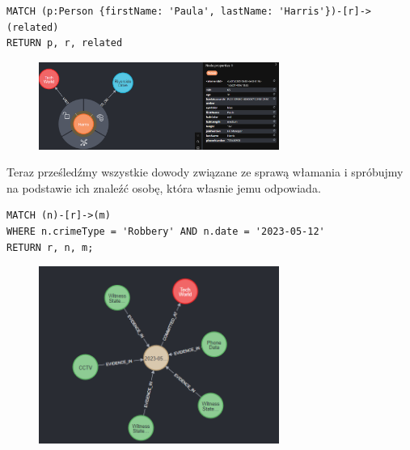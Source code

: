 \documentclass[a4paper,12pt]{article}
\begin{document}
\begin{center}
\begin{minipage}{0.8\linewidth}
\begin{lstlisting}[language=Cypher, basicstyle=\small, breaklines=true]
MATCH (p:Person {firstName: 'Paula', lastName: 'Harris'})-[r]->(related)
RETURN p, r, related
\end{lstlisting}
\end{minipage}
\end{center}

\begin{figure}[h!]
    \centering
    \includegraphics[width=0.7\textwidth]{paula_harris.png}
\end{figure}

Teraz prześledźmy wszystkie dowody związane ze sprawą włamania i spróbujmy na podstawie ich znaleźć osobę, która własnie jemu odpowiada.

\begin{center}
\begin{minipage}{0.8\linewidth}
\begin{lstlisting}[language=Cypher, basicstyle=\small, breaklines=true]
MATCH (n)-[r]->(m)
WHERE n.crimeType = 'Robbery' AND n.date = '2023-05-12' 
RETURN r, n, m;
\end{lstlisting}
\end{minipage}
\end{center}

\begin{figure}[h!]
    \centering
    \includegraphics[width=0.7\textwidth]{robbery.png} 
\end{figure}
\end{document}
